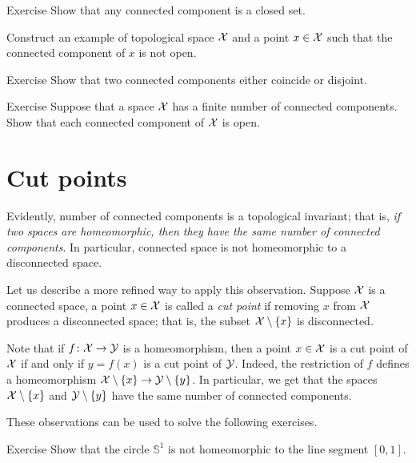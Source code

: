 \begin{thm}{Exercise}\label{ex:nonopen-connected-component}
Show that any connected component is a closed set.

Construct an example of topological space $\mathcal{X}$ and a point $x\in \mathcal{X}$ such that the connected component of $x$ is not open.
\end{thm}

\begin{thm}{Exercise}\label{ex:connected-component-disjoint}
Show that two connected components either coincide or disjoint.
\end{thm}

\begin{thm}{Exercise}\label{ex:finite-number-connected-component}
Suppose that a space $\mathcal{X}$ has a finite number of connected components.
Show that each connected component of $\mathcal{X}$ is open.
\end{thm}



\section{Cut points}

Evidently, number of connected components is a topological invariant;
that is, \textit{if two spaces are homeomorphic, then they have the same number of connected components}.
In particular, connected space is not homeomorphic to a disconnected space.

Let us describe a more refined way to apply this observation.
Suppose $\mathcal{X}$ is a connected space, a point $x \in\mathcal{X}$ is called a \emph{cut point} if removing $x$ from $\mathcal{X}$ produces a disconnected space;
that is, the subset $\mathcal{X}\setminus\{x\}$ is disconnected.

Note that if $f\colon\mathcal{X}\to \mathcal{Y}$ is a homeomorphism, then a point $x \in\mathcal{X}$ is a cut point of $\mathcal{X}$ if and only if $y=f(x)$ is a cut point of $\mathcal{Y}$.
Indeed, the restriction of $f$ defines a homeomorphism $\mathcal{X}\setminus\{x\}\to \mathcal{Y}\setminus\{y\}$.
In particular, we get that the spaces $\mathcal{X}\setminus\{x\}$ and $\mathcal{Y}\setminus\{y\}$ have the same number of connected components.

These observations can be used to solve the following exercises.

\begin{thm}{Exercise}\label{ex:S1ne[0,1]}
Show that the circle $\mathbb{S}^1$ is not homeomorphic to the line segment $[0,1]$.
\end{thm}

